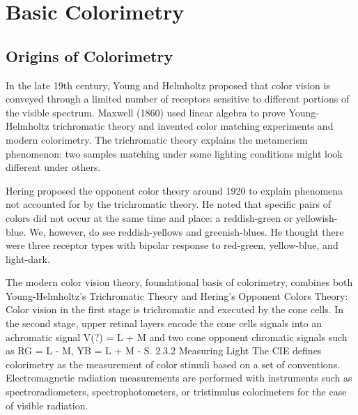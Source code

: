 \section{Basic Colorimetry}%
\label{sec:basic-colorimetry}

\subsection{Origins of Colorimetry}%
\label{subsec:origins-of-colorimetry}

In the late 19th century, Young and Helmholtz proposed that color vision is conveyed through a limited number of receptors sensitive to different portions of the visible spectrum. Maxwell (1860) used linear algebra to prove Young-Helmholtz trichromatic theory and invented color matching experiments and modern colorimetry. The trichromatic theory explains the metamerism phenomenon: two samples matching under some lighting conditions might look different under others.


Hering proposed the opponent color theory around 1920 to explain phenomena not accounted for by the trichromatic theory. He noted that specific pairs of colors did not occur at the same time and place: a reddish-green or yellowish-blue. We, however, do see reddish-yellows and greenish-blues. He thought there were three receptor types with bipolar response to red-green, yellow-blue, and light-dark.


The modern color vision theory,  foundational basis of colorimetry, combines both Young-Helmholtz's Trichromatic Theory and Hering's Opponent Colors Theory: Color vision in the first stage is trichromatic and executed by the cone cells. In the second stage, upper retinal layers encode the cone cells signals into an achromatic signal V(?) = L + M and two cone opponent chromatic signals such as RG = L - M, YB = L + M - S.
2.3.2 Measuring Light
The CIE defines colorimetry as the measurement of color stimuli based on a set of conventions. Electromagnetic radiation measurements are performed with instruments such as spectroradiometers, spectrophotometers, or tristimulus colorimeters for the case of visible radiation.

